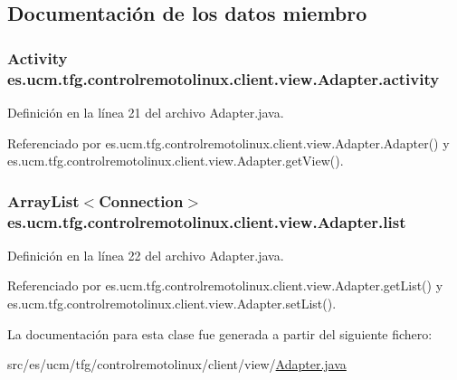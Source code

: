 \subsection{Documentación de los datos miembro}
\hypertarget{classes_1_1ucm_1_1tfg_1_1controlremotolinux_1_1client_1_1view_1_1Adapter_ae3c65fabd92deab9e82160b8581775b9}{
\subsubsection[{activity}]{\setlength{\rightskip}{0pt plus 5cm}Activity es.\-ucm.\-tfg.\-controlremotolinux.\-client.\-view.\-Adapter.\-activity\hspace{0.3cm}{\ttfamily [private]}}}\label{classes_1_1ucm_1_1tfg_1_1controlremotolinux_1_1client_1_1view_1_1Adapter_ae3c65fabd92deab9e82160b8581775b9}


Definición en la línea 21 del archivo Adapter.\-java.



Referenciado por es.\-ucm.\-tfg.\-controlremotolinux.\-client.\-view.\-Adapter.\-Adapter() y es.\-ucm.\-tfg.\-controlremotolinux.\-client.\-view.\-Adapter.\-get\-View().

\hypertarget{classes_1_1ucm_1_1tfg_1_1controlremotolinux_1_1client_1_1view_1_1Adapter_abb82be6d61fd4f29e186da511fcf8199}{
\subsubsection[{list}]{\setlength{\rightskip}{0pt plus 5cm}Array\-List$<${\bf Connection}$>$ es.\-ucm.\-tfg.\-controlremotolinux.\-client.\-view.\-Adapter.\-list\hspace{0.3cm}{\ttfamily [private]}}}\label{classes_1_1ucm_1_1tfg_1_1controlremotolinux_1_1client_1_1view_1_1Adapter_abb82be6d61fd4f29e186da511fcf8199}


Definición en la línea 22 del archivo Adapter.\-java.



Referenciado por es.\-ucm.\-tfg.\-controlremotolinux.\-client.\-view.\-Adapter.\-get\-List() y es.\-ucm.\-tfg.\-controlremotolinux.\-client.\-view.\-Adapter.\-set\-List().



La documentación para esta clase fue generada a partir del siguiente fichero\-:\begin{DoxyCompactItemize}
\item 
src/es/ucm/tfg/controlremotolinux/client/view/\hyperlink{Adapter_8java}{Adapter.\-java}\end{DoxyCompactItemize}
